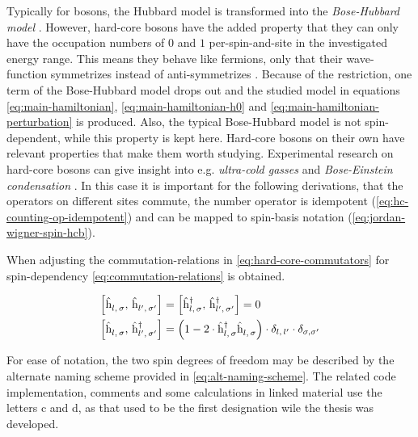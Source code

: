 Typically for bosons, the Hubbard model is transformed into the \emph{Bose-Hubbard model} \cite{boseHubbardModelOriginalDerivation}.
However, hard-core bosons have the added property that they can only have the occupation numbers of $0$ and $1$ per-spin-and-site in the investigated energy range.
This means they behave like fermions, only that their wave-function symmetrizes instead of anti-symmetrizes \cite{schwablBook}.
Because of the restriction, one term of the Bose-Hubbard model drops out and the studied model in equations \ref{eq:main-hamiltonian}, \ref{eq:main-hamiltonian-h0} and \ref{eq:main-hamiltonian-perturbation} is produced.
Also, the typical Bose-Hubbard model is not spin-dependent, while this property is kept here.
Hard-core bosons on their own have relevant properties that make them worth studying. 
Experimental research on hard-core bosons can give insight into e.g. \emph{ultra-cold gasses} and \emph{Bose-Einstein condensation} \cite{hardCoreBosonsBasics}. 
In this case it is important for the following derivations, that the operators on different sites commute, the number operator is idempotent (\ref{eq:hc-counting-op-idempotent}) and can be mapped to spin-basis notation (\ref{eq:jordan-wigner-spin-hcb}).

When adjusting the commutation-relations in \autoref{eq:hard-core-commutators} for spin-dependency \autoref{eq:commutation-relations} is obtained.

\begin{equation}
    \label{eq:commutation-relations}
    \begin{split}
        \left[\withspinhcop[]{l}{\sigma}{},\,\withspinhcop[]{l'}{\sigma'}{}\right] &= 
        \left[\withspinhcop[]{l}{\sigma}{\dagger},\,\withspinhcop[]{l'}{\sigma'}{\dagger}\right] = 0\\
        \left[\withspinhcop[]{l}{\sigma}{},\,\withspinhcop[]{l'}{\sigma'}{\dagger}\right] &= 
        \left(1 - 2 \cdot \withspinhcop[]{l}{\sigma}{\dagger}\withspinhcop[]{l}{\sigma}{} \right) \cdot \delta_{l,\,l'}\cdot\delta_{\sigma,\sigma'}
    \end{split}
\end{equation}

For ease of notation, the two spin degrees of freedom may be described by the alternate naming scheme provided in \autoref{eq:alt-naming-scheme}.
The related code implementation, comments and some calculations in linked material \cite{selfCode} use the letters c and d, as that used to be the first designation wile the thesis was developed.

